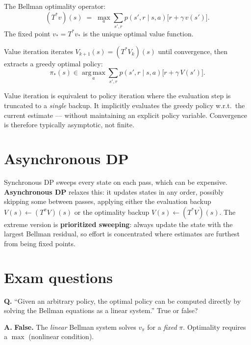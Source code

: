 \documentclass[11pt, oneside]{book}
\newcommand{\argmax}{\operatorname*{arg\,max}}
\begin{document}
\begin{thmbox}[title={Value Iteration}]
The Bellman optimality operator:
\[
  (T^*v)(s) \;=\; \max_a \sum_{s',r} p(s',r\mid s,a)\bigl[r + \gamma\,v(s')\bigr].
\]
The fixed point $v_* = T^*v_*$ is the unique optimal value function.

Value iteration iterates $V_{k+1}(s) = (T^*V_k)(s)$ until convergence,
then extracts a greedy optimal policy:
\[
  \pi_*(s) \in \argmax_a \sum_{s',r} p(s',r\mid s,a)\bigl[r + \gamma\,V(s')\bigr].
\]
\end{thmbox}

\begin{intbox}[title={Value Iteration as Policy Iteration with One Backup}]
Value iteration is equivalent to policy iteration where the evaluation step
is truncated to a \emph{single} backup. It implicitly evaluates the greedy
policy w.r.t.\ the current estimate --- without maintaining an explicit policy
variable. Convergence is therefore typically asymptotic, not finite.
\end{intbox}

\section{Asynchronous DP}

Synchronous DP sweeps every state on each pass, which can be expensive.
\textbf{Asynchronous DP} relaxes this: it updates states in any order,
possibly skipping some between passes, applying either the evaluation backup
$V(s) \leftarrow (T^{\pi}V)(s)$ or the optimality backup
$V(s) \leftarrow (T^*V)(s)$. The extreme version is
\textbf{prioritized sweeping}: always update the state with the largest
Bellman residual, so effort is concentrated where estimates are furthest
from being fixed points.

\section{Exam questions}

\begin{exbox}[title={Exam: Optimal Policy via Linear Bellman Equations}]
\textbf{Q.} ``Given an arbitrary policy, the optimal policy can be computed
directly by solving the Bellman equations as a linear system.'' True or false?

\medskip
\textbf{A.} \textbf{False.} The \emph{linear} Bellman system solves $v_\pi$
for a \emph{fixed} $\pi$. Optimality requires a $\max$ (nonlinear condition).
\end{exbox}
\end{document}
